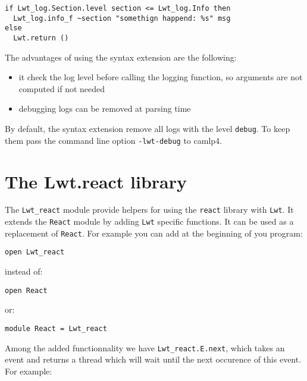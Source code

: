 \lstset{language=[Objective]Caml}\begin{lstlisting}
if Lwt_log.Section.level section <= Lwt_log.Info then
  Lwt_log.info_f ~section "somethign happend: %s" msg
else
  Lwt.return ()

\end{lstlisting}
The advantages of using the syntax extension are the following:



\begin{itemize}
\item  it check the log level before calling the logging function, so
arguments are not computed if not needed
\item  debugging logs can be removed at parsing time

\end{itemize}

By default, the syntax extension remove all logs with the level
{\tt debug}. To keep them pass the command line option
{\tt -lwt-debug} to camlp4.



\section{ The Lwt.react library }

The {\tt Lwt\_react} module provide helpers for using the {\tt react}
library with {\tt Lwt}. It extends the {\tt React} module by adding
{\tt Lwt} specific functions. It can be used as a replacement of
{\tt React}. For example you can add at the beginning of you
program:



\lstset{language=[Objective]Caml}\begin{lstlisting}
open Lwt_react

\end{lstlisting}
instead of:



\lstset{language=[Objective]Caml}\begin{lstlisting}
open React

\end{lstlisting}
or:



\lstset{language=[Objective]Caml}\begin{lstlisting}
module React = Lwt_react

\end{lstlisting}
Among the added functionnality we have {\tt Lwt\_react.E.next}, which
takes an event and returns a thread which will wait until the next
occurence of this event. For example:



